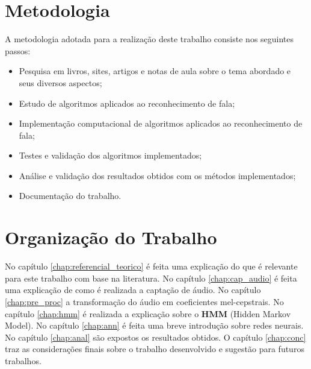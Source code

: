 \section{Metodologia}

\quad A metodologia adotada para a realização deste trabalho consiste nos seguintes passos:

\begin{itemize}
\item Pesquisa em livros, sites, artigos e notas de aula sobre o tema abordado e seus diversos aspectos;
\item Estudo de algoritmos aplicados ao reconhecimento de fala;
\item Implementação computacional de algoritmos aplicados ao reconhecimento de fala;
\item Testes e validação dos algoritmos implementados;
\item Análise e validação dos resultados obtidos com os métodos implementados;
\item Documentação do trabalho. 

\end{itemize}

\section{Organização do Trabalho}
\quad No capítulo \ref{chap:referencial_teorico} é feita uma explicação do que é relevante para este trabalho com base na literatura. No capítulo \ref{chap:cap_audio}  é feita uma explicação de como é realizada a captação de áudio. No capítulo \ref{chap:pre_proc} a transformação do áudio em coeficientes mel-cepstrais. No capítulo \ref{chap:hmm} é realizada a explicação sobre o \textbf{HMM} (Hidden Markov Model). No capítulo \ref{chap:ann} é feita uma breve introdução sobre  redes neurais. No capítulo \ref{chap:anal} são expostos os resultados obtidos. O capítulo \ref{chap:conc} traz as considerações finais sobre o trabalho desenvolvido e sugestão para futuros trabalhos.


























